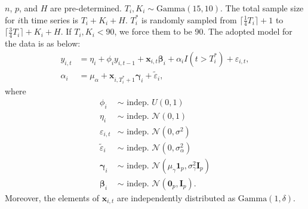 \documentclass[12pt]{article}
\def\mbf#1{\mathbf{#1}} %
\def\mrm#1{\mathrm{#1}} %
\def\mc#1{\mathcal{#1}} %
\def\mc#1{\mathcal{#1}}
\def\bs#1{\boldsymbol{#1}}
\newcommand{\ceil}[1]{\lceil #1 \rceil}
\theoremstyle{definition}
\theoremstyle{definition}
\begin{document}
$n$, $p$, and $H$ are pre-determined. $T_i, K_i \sim \mrm{Gamma}(15, 10)$.  The total sample size for $i$th time series is $T_i + K_i + H$. $T_i^*$ is randomly sampled from $\ceil{\frac{1}{4}T_i}+1$ to $\ceil{\frac{3}{4} T_i} + K_i+ H$. If $T_i, K_i < 90$, we force them to be 90. The adopted model for the data is as below:
\begin{align*}
  y_{i,t} &= \eta_i + \phi_i y_{i,t-1} + \mbf{x}_{i,t} \bs{\beta}_i + \alpha_i I(t > T_i^*) + \varepsilon_{i,t},\\
  \alpha_i &= \mu_{\alpha} + \mbf{x}_{i,T_i^*+1}\bs{\gamma}_i + \tilde{\varepsilon}_{i},
\end{align*}
where
\begin{align*}
  \phi_i & \sim \text{ indep. }  U(0,1) \\
  \eta_i & \sim \text{ indep. }  \mc{N}(0,1) \\
  \varepsilon_{i,t} & \sim \text{ indep. } \mc{N}(0, \sigma^2)\\
  \tilde{\varepsilon}_i & \sim \text{ indep. } \mc{N}(0, \sigma_{\alpha}^2)
  \\
  \bs{\gamma}_i & \sim \text{ indep. } \mc{N}(\mu_{\gamma}\bs{1}_p, \sigma_{\gamma}^2 \mbf{I}_p) \\
  \bs{\beta}_i & \sim \text{ indep. }  \mc{N}(\bs{0}_p, \mbf{I}_p).
\end{align*}
Moreover, the elements of $\mathbf{x}_{i,t}$ are independently distributed as $\mrm{Gamma}(1,\delta)$.




  
\end{document}
